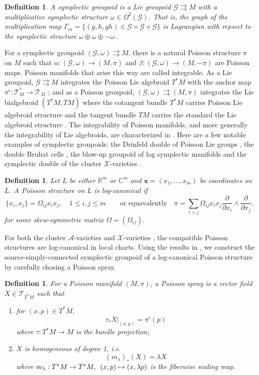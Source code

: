 \documentclass{amsart}
\newtheorem{definition}[theorem]{Definition}
\numberwithin{equation}{section}
\newcommand{\bfx}{\mathbf{x}}
\newcommand{\cA}{\mathcal{A}}
\newcommand{\cG}{\mathcal{G}}
\newcommand{\cX}{\mathcal{X}}
\newcommand{\cT}{\mathcal{T}}
\newcommand{\CC}{\mathbb{C}}
\newcommand{\RR}{\mathbb{R}}
\newcommand{\rra}{\rightrightarrows}
\begin{document}
\begin{definition}
  A symplectic groupoid is a Lie groupoid $\cG \rra M$ with a multiplicative symplectic structure $\omega \in \Omega^2(\cG)$.
  That is, the graph of the multiplication map $\Gamma_m = \{(g, h, gh) \in \cG \times \cG \times \cG\}$ is Lagrangian with repsect to the symplectic structure $\omega \oplus \omega \oplus -\omega$.
\end{definition}

For a symplectic groupoid $(\cG, \omega) \rra M$, there is a natural Poisson structure $\pi$ on $M$ such that $\alpha: (\cG, \omega) \to (M, \pi)$ and $\beta: (\cG, \omega) \to (M, -\pi)$ are Poisson maps. Poisson manifolds that arise this way are called integrable. As a Lie groupoid, $\cG \rra M$ integrates the Poisson Lie algebroid $T^*M$ with the anchor map $\pi^\flat: \cT^*_M \to \cT_M$ \cite{MR866024}; and as a Poisson groupoid, $(\cG, \omega) \rra (M, \pi)$ integrates the Lie bialgebroid $(T^*M, TM)$ where the cotangent bundle $T^*M$ carries Poisson Lie algebroid structure and the tangent bundle $TM$ carries the standard the Lie algebroid structure \cite{MR1262213}. The integrability of Poisson manifolds, and more generally the integrability of Lie algebroids, are characterized in \cite{MR1973056, MR2128714}. Here are a few notable examples of symplectic groupoids: the Drinfeld double of Poisson Lie groups \cite{MR1054741}, the double Bruhat cells \cite{LuM16}, the blow-up groupoid of log symplectic manifolds \cite{MR3214314} and the symplectic double of the cluster $\cX$-varieties \cite{MR2470108}.

\begin{definition}
	Let $L$ be either $\RR^m$ or $\CC^m$ and $\bfx = (x_1, \ldots, x_m)$ be coordinates on $L$. A Poisson structure on $L$ is log-canonical if
$$
	\{x_i, x_j\} = \Omega_{ij} x_ix_j, \quad 1 \leq i,j \leq m \qquad \text{or equavalently} \quad
	\pi = \sum_{i > j} \Omega_{ij} x_ix_j\frac{\partial}{\partial x_i} \wedge \frac{\partial}{\partial x_j},
$$
for some skew-symmetric matrix $\Omega = (\Omega_{ij})$.
\end{definition}

For both the cluster $\cA$-varieties \cite{MR2683456} and $\cX$-varieties \cite{MR2470108}, the compatible Poisson structures are log-canonical in local charts.  Using the results in \cite{MR2900786, CMS17}, we construct the source-simply-connected symplectic groupoid of a log-canonical Poisson structure by carefully chosing a Poisson spray. 

\begin{definition} \cite{MR2900786}
For a Poisson manifold $(M, \pi)$, a Poisson spray is a vector field $X \in \cT_{T^*M}$ such that
	\begin{enumerate}
		\item for $(x,p) \in T^*M$,
			\[
				\tau_* X|_{(x,p)} = \pi^\flat(p)
			\]
			where $\tau: T^*M \to M$ is the bundle projection;
		\item
			$X$ is homogeneous of degree 1, i.e.
			\[
				(m_\lambda)_*(X) = \lambda X 
			\]
			where $m_\lambda: T^*M \to T^*M, \enskip (x,p) \mapsto (x,\lambda p)$ is the fiberwise scaling map.
	\end{enumerate}
\end{definition}
\end{document}
